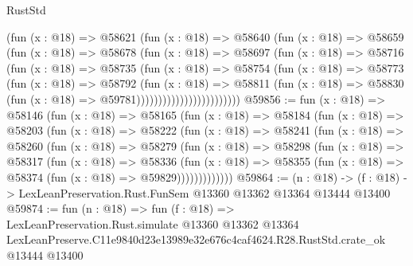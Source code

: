 \begin{lexlean}{RustStd}
\begin{coremodule}
                          (fun (x : @18) =>
                          @58621
                            (fun (x : @18) =>
                            @58640
                              (fun (x : @18) =>
                              @58659
                                (fun (x : @18) =>
                                @58678
                                  (fun (x : @18) =>
                                  @58697
                                    (fun (x : @18) =>
                                    @58716
                                      (fun (x : @18) =>
                                      @58735
                                        (fun (x : @18) =>
                                        @58754
                                          (fun (x : @18) =>
                                          @58773
                                            (fun (x : @18) =>
                                            @58792
                                              (fun (x : @18) =>
                                              @58811
                                                (fun (x : @18) =>
                                                @58830
                                                  (fun (x : @18) => @59781))))))))))))))))))))))))
@59856 := fun (x : @18) =>
  @58146
    (fun (x : @18) =>
    @58165
      (fun (x : @18) =>
      @58184
        (fun (x : @18) =>
        @58203
          (fun (x : @18) =>
          @58222
            (fun (x : @18) =>
            @58241
              (fun (x : @18) =>
              @58260
                (fun (x : @18) =>
                @58279
                  (fun (x : @18) =>
                  @58298
                    (fun (x : @18) =>
                    @58317
                      (fun (x : @18) =>
                      @58336
                        (fun (x : @18) =>
                        @58355 (fun (x : @18) => @58374 (fun (x : @18) => @59829)))))))))))))
@59864 := (n : @18) ->
  (f : @18) -> LexLeanPreservation.Rust.FunSem @13360 @13362 @13364 @13444 @13400
@59874 := fun (n : @18) =>
  fun (f : @18) =>
  LexLeanPreservation.Rust.simulate
    @13360
    @13362
    @13364
    LexLeanPreserve.C11e9840d23e13989e32e676c4caf4624.R28.RustStd.crate_ok
    @13444
    @13400
\end{coremodule}
\end{lexlean}

